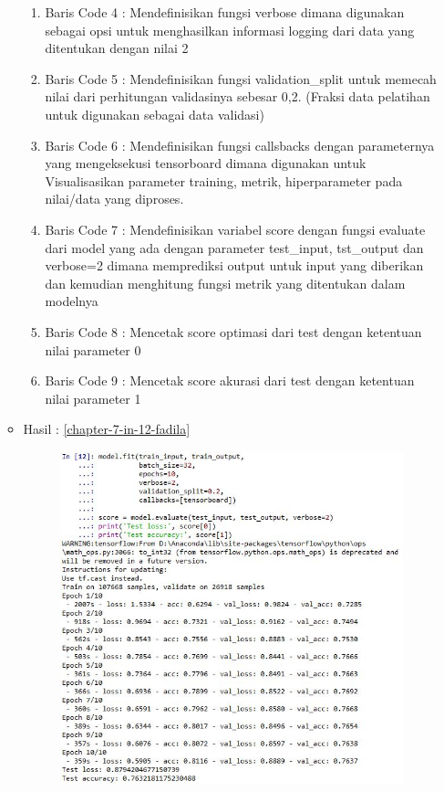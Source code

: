 \begin{enumerate}
\begin{itemize}
\begin{enumerate}
\item Baris Code 4	: Mendefinisikan fungsi verbose dimana digunakan sebagai opsi untuk menghasilkan informasi logging dari data yang ditentukan dengan nilai 2
\item Baris Code 5	: Mendefinisikan fungsi validation\_split untuk memecah nilai dari perhitungan validasinya sebesar 0,2. (Fraksi data pelatihan untuk digunakan sebagai data validasi)
\item Baris Code 6	: Mendefinisikan fungsi callsbacks dengan parameternya yang mengeksekusi tensorboard dimana digunakan untuk Visualisasikan parameter training, metrik, hiperparameter pada nilai/data yang diproses.
\item Baris Code 7	: Mendefinisikan variabel score dengan fungsi evaluate dari model yang ada dengan parameter test\_input, tst\_output dan verbose=2 dimana memprediksi output untuk input yang diberikan dan kemudian menghitung fungsi metrik yang ditentukan dalam modelnya
\item Baris Code 8	: Mencetak score optimasi dari test dengan ketentuan nilai parameter 0
\item Baris Code 9	: Mencetak score akurasi dari test dengan ketentuan nilai parameter 1
\end{enumerate}
\par
\item Hasil : \ref{chapter-7-in-12-fadila}
\par
\par
\begin{figure}[!hbtp]
\centering
\includegraphics[scale=0.4]{figures/chapter-7-in-12-fadila.jpg}

\end{figure}
\end{itemize}
\end{enumerate}
